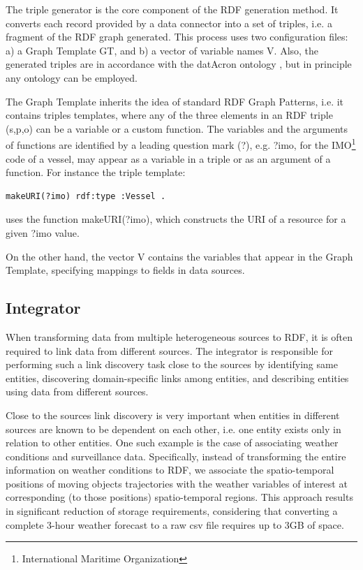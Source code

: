 \documentclass{sig-alternate}
\begin{document}
The triple generator is the core component of the RDF generation method. It converts each record provided by a data connector into a set of triples, i.e. a fragment of the RDF graph generated. This process uses two configuration files: a) a Graph Template GT, and b) a vector of variable names V. Also, the generated triples are in accordance with the datAcron ontology  \cite{_Ref490495645}, but in principle any ontology can be employed.

The Graph Template inherits the idea of standard RDF Graph Patterns, i.e. it contains triples templates, where any of the three elements in an RDF triple (s,p,o) can be a variable or a custom function. The variables and the arguments of functions are identified by a leading question mark (?), e.g. ?imo, for the IMO\footnote{ International Maritime Organization} code of a vessel, may appear as a variable in a triple or as an argument of a function. For instance the triple template:

\begin{lstlisting}[mathescape]
makeURI(?imo) rdf:type :Vessel .
\end{lstlisting}

uses the function makeURI(?imo), which constructs the URI of a resource for a given ?imo value. 

On the other hand, the vector V contains the variables that appear in the Graph Template, specifying mappings to fields in data sources.

\subsection{Integrator}

When transforming data from multiple heterogeneous sources to RDF, it is often required to link data from different sources.  The integrator is responsible for performing such a link discovery task close to the sources by identifying same entities, discovering domain-specific links among entities, and describing entities using data from different sources. 

Close to the sources link discovery is very important when entities in different sources are known to be dependent on each other, i.e. one entity exists only in relation to other entities. One such example is the case of associating weather conditions and surveillance data. Specifically, instead of transforming the entire information on weather conditions to RDF, we associate the spatio-temporal positions of moving objects trajectories with the weather variables of interest at corresponding (to those positions) spatio-temporal regions. This approach results in significant reduction of storage requirements, considering that converting a complete 3-hour weather forecast to a raw csv file requires up to 3GB of space.
\end{document}
